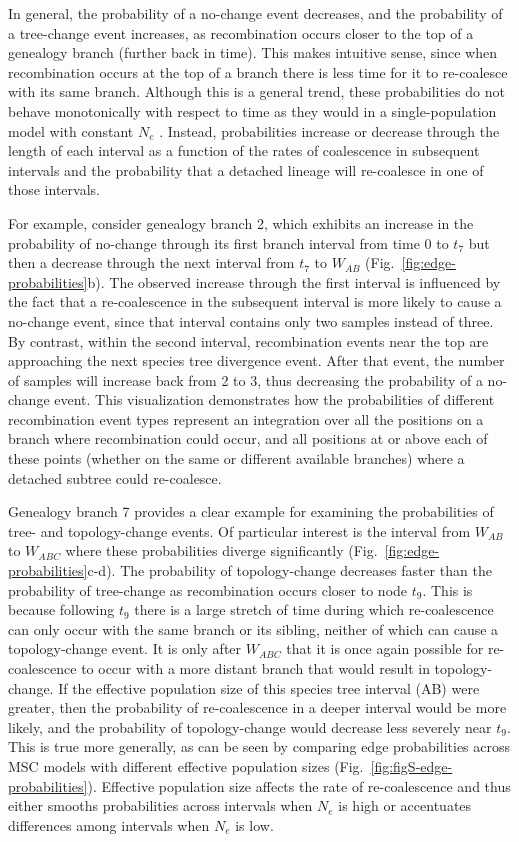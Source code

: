 \documentclass[11pt]{article}
\begin{document}
In general, the probability of a no-change event decreases, and the probability
of a tree-change event increases, as recombination occurs closer to the top
of a genealogy branch (further back in time). 
This makes intuitive sense, since when 
recombination occurs at the top of a branch there is less time for it to re-coalesce 
with its same branch. Although this is a general trend, these probabilities do not 
behave monotonically with respect to time as they would in a 
single-population model with constant $N_e$ \citep{deng_distribution_2021}.
Instead, probabilities increase or decrease through the length of each
interval as a function of the rates of coalescence in subsequent 
intervals and the probability that a detached lineage will 
re-coalesce in one of those intervals.

For example, consider genealogy branch 2, which exhibits an increase in the
probability of no-change through its first branch interval from time 0 to
$t_7$ but then a decrease through the next interval from $t_7$ to $W_{AB}$
(Fig.~\ref{fig:edge-probabilities}b).
The observed increase through the first interval is influenced by the fact that
a re-coalescence in the subsequent interval is more likely to cause a no-change
event, since that interval contains only two samples instead of three.
By contrast, within the second interval, recombination events near 
the top are approaching the next species tree divergence event. After that event, the 
number of samples will increase back from 2 to 3, 
thus decreasing the probability of a no-change event. 
This visualization demonstrates how the probabilities of different recombination 
event types represent an integration over all the positions on a branch where 
recombination could occur, and all positions at or above each of these points (whether on the 
same or different available branches) where a detached subtree could re-coalesce. 

Genealogy branch 7 provides a clear example for examining the probabilities of 
tree- and topology-change events. Of particular interest is the 
interval from $W_{AB}$ to $W_{ABC}$ where these probabilities diverge 
significantly (Fig.~\ref{fig:edge-probabilities}c-d). 
The probability of topology-change decreases faster than the probability of 
tree-change as recombination occurs closer to node $t_9$. This is because 
following $t_9$ there is a large stretch of time during which re-coalescence can
only occur with the same branch or its sibling, neither of which can cause a topology-change
event. It is only after $W_{ABC}$ that it is once again possible for re-coalescence
to occur with a more distant branch that would result in topology-change. 
If the effective population size of this species tree interval (AB) were greater,
then the probability of re-coalescence in a deeper interval would be more likely, 
and the probability of topology-change would decrease less severely near $t_9$. 
This is true more generally, as can be seen by comparing edge probabilities
across MSC models with different effective population sizes (Fig.~\ref{fig:figS-edge-probabilities}).
Effective population size affects the rate of re-coalescence and thus 
either smooths probabilities across intervals when 
$N_e$ is high or accentuates differences among intervals when $N_e$ is low.
\end{document}
